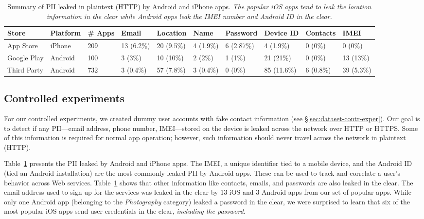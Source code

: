 \begin{table}[t]    
    \centering
    \begin{small}
    \begin{tabular}{|l|l|l|l|l|l|l|l|l|l|}
       \hline
       {\bf Store}&{\bf Platform}&{\bf \# Apps}&{\bf Email}& {\bf Location}& {\bf Name} &{\bf Password}& {\bf Device ID}& {\bf Contacts}& {\bf IMEI}\\
       \hline
       App Store&iPhone&209&13 (6.2\%) &20 (9.5\%)&4 (1.9\%)&6 (2.87\%)&4 (1.9\%)&0 (0\%)&0 (0\%)\\
       \hline
       Google Play&Android&100&3 (3\%)&10 (10\%)&2 (2\%)&1 (1\%)&21 (21\%)&0 (0\%)&13 (13\%)\\
       \hline
Third Party&Android&732&3 (0.4\%)&57 (7.8\%)&3 (0.4\%)&0 (0\%)&85 (11.6\%)&6 (0.8\%)&39 (5.3\%)\\
       \hline
    \end{tabular}
    \end{small}
    \caption{Summary of PII leaked in plaintext (HTTP) by Android and iPhone apps. \emph{The popular iOS apps tend to leak the location information in the clear while Android apps leak the IMEI number and Android ID in the clear. }}
    \vspace{\postfigspace}
    \label{tab:pii}
\end{table}

\subsection{Controlled experiments}

For our controlled experiments, we created dummy user accounts with fake contact information (see \S\ref{sec:dataset-contr-exper}).  
Our goal is to detect if any PII---email address, phone number, IMEI---stored on the device is leaked across the network over HTTP or HTTPS.
Some of this information is required for normal app operation; however, such information should never travel across the network in plaintext (HTTP).  

Table~\ref{tab:pii} presents the PII leaked by Android and iPhone apps. 
The IMEI, a unique identifier tied to a mobile device, and the Android ID (tied an Android installation) are the most commonly leaked PII by Android apps.  
These can be used to track and correlate a user's behavior across Web services. 
Table~\ref{tab:pii} shows that other information like contacts, emails, and passwords are also leaked in the clear. 
The email address used to sign up for the services was leaked in the clear by 13 iOS and 3 Android apps from our set of popular apps.
While only one Android app (belonging to the \emph{Photography} category) leaked a password in the clear, we were surprised to learn that six of the most popular iOS apps send user credentials in the clear, \emph{including the password}. 

